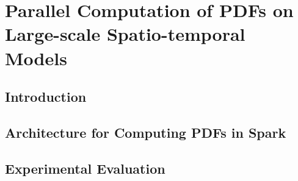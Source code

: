 \chapter{Parallel Computation of PDFs on Large-scale Spatio-temporal Models}\label{cap:ji}

\section{Introduction}

\section{Architecture for Computing PDFs in Spark}

\section{Experimental Evaluation}
